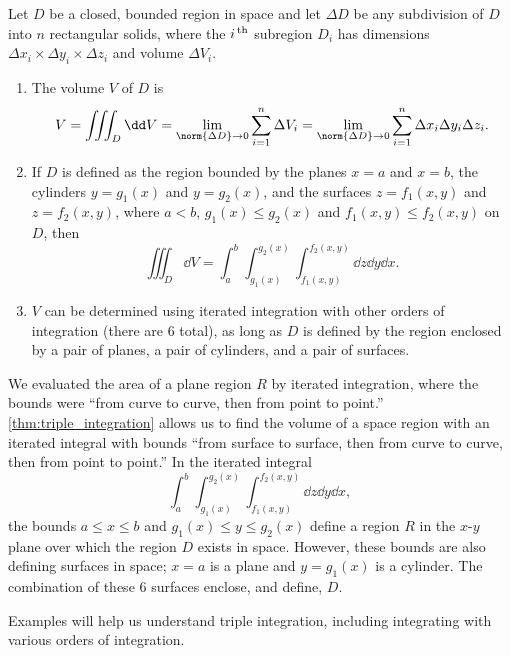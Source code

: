 {
\begin{theorem}\label{thm:triple_integration}
Let $D$ be a closed, bounded region in space and let $\Delta D$ be any subdivision of $D$ into $n$ rectangular solids, where the  $i^\text{\,th}$ subregion $D_i$ has dimensions $\Delta x_i\times\Delta y_i\times\Delta z_i$ and volume $\Delta V_i$.
\begin{enumerate}
	\item	The volume $V$ of $D$ is
	\[V = \iiint_D\dd V = \lim_{\norm{\Delta D}\to0} \sum_{i=1}^n \Delta V_i = \lim_{\norm{\Delta D}\to0} \sum_{i=1}^n \Delta x_i\Delta y_i\Delta z_i.\]

	\item	If $D$ is defined as the region bounded by the planes $x=a$ and $x=b$, the cylinders $y=g_1(x)$ and $y=g_2(x)$, and the surfaces $z=f_1(x,y)$ and $z=f_2(x,y)$, where $a<b$, $g_1(x)\leq g_2(x)$ and $f_1(x,y)\leq f_2(x,y)$ on $D$, then
	\[\iiint_D \dd V = \int_a^b\int_{g_1(x)}^{g_2(x)}\int_{f_1(x,y)}^{f_2(x,y)} \dd z\dd y\dd x.\]

	\item	$V$ can be determined using iterated integration with other orders of integration (there are 6 total), as long as $D$ is defined by the region enclosed by a pair of planes, a pair of cylinders, and a pair of surfaces.
\end{enumerate}
\end{theorem}
}

We evaluated the area of a plane region $R$ by iterated integration, where the bounds were ``from curve to curve, then from point to point.'' \autoref{thm:triple_integration} allows us to find the volume of a space region with an iterated integral with bounds ``from surface to surface, then from curve to curve, then from point to point.'' In the iterated integral 
\[\int_a^b\int_{g_1(x)}^{g_2(x)}\int_{f_1(x,y)}^{f_2(x,y)} \dd z\dd y\dd x,\]
the bounds $a\leq x\leq b$ and $g_1(x)\leq y\leq g_2(x)$ define a region $R$ in the $x$-$y$ plane over which the region $D$ exists in space. However, these bounds are also defining surfaces in space; $x=a$ is a plane and $y=g_1(x)$ is a cylinder. The combination of these 6 surfaces enclose, and define, $D$.


Examples will help us understand triple integration, including integrating with various orders of integration.

